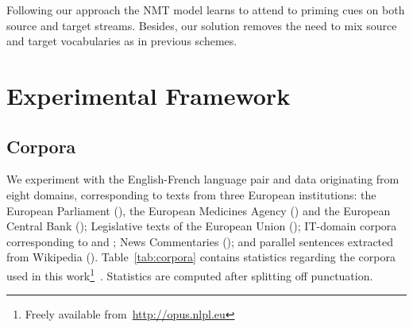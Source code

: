 Following our approach the NMT model learns to attend to priming cues on both source and target streams.
Besides, our solution removes the need to mix source and target vocabularies as in  previous schemes.

\section{Experimental Framework}
\label{sec:eperiments}

\subsection{Corpora}
\label{ssec:corpora}

We experiment with the English-French language pair and data originating from eight domains, corresponding to texts from three European institutions: 
the European Parliament (), 
the European Medicines Agency () and
the European Central Bank ();
Legislative texts of the European Union ();
IT-domain corpora corresponding to  and ;
News Commentaries ();
and parallel sentences extracted from Wikipedia ().
%
Table~\ref{tab:corpora} contains statistics regarding the corpora used in this work\footnote{Freely available from~\url{http://opus.nlpl.eu}}~\cite{Tiedemann12parallel}. Statistics are computed after splitting off punctuation.

